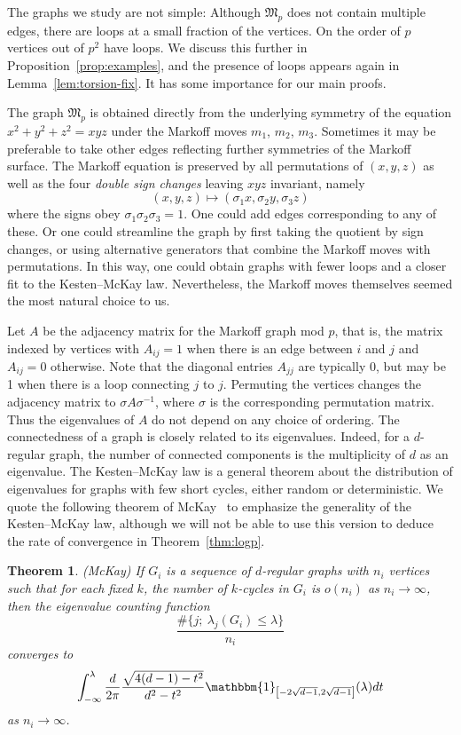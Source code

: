 \documentclass[10pt]{amsart}
\newtheorem{theo}{Theorem}[section]
\theoremstyle{definition}\newtheorem{defi}[theo]{Definition}\newtheorem{rema}[theo]{Remark}\newtheorem{exam}[theo]{Example}\newtheorem{exem}[theo]{Example}\newtheorem{nota}[theo]{Notation}
\begin{document}
The graphs we study are not simple: Although $\mathfrak{M}_p$ does not contain multiple edges, there are loops at a small fraction of the vertices. On the order of $p$ vertices out of $p^2$ have loops. We discuss this further in Proposition~\ref{prop:examples}, and the presence of loops appears again in Lemma~\ref{lem:torsion-fix}. It has some importance for our main proofs.

The graph $\mathfrak{M}_p$ is obtained directly from the underlying symmetry of the equation $x^2+y^2 +z^2 =xyz$ under the Markoff moves $m_1$, $m_2$, $m_3$. Sometimes it may be preferable to take other edges reflecting further symmetries of the Markoff surface. The Markoff equation is preserved by all permutations of $(x,y,z)$ as well as the four \emph{double sign changes} leaving $xyz$ invariant, namely
\begin{equation}\label{eqn:signs}
(x,y,z) \mapsto (\sigma_1 x, \sigma_2 y, \sigma_3 z)
\end{equation}
where the signs obey $\sigma_1 \sigma_2 \sigma_3 = 1$. One could add edges corresponding to any of these. Or one could streamline the graph by first taking the quotient by sign changes, or using alternative generators that combine the Markoff moves with permutations. In this way, one could obtain graphs with fewer loops and a closer fit to the Kesten--McKay law. Nevertheless, the Markoff moves themselves seemed the most natural choice to us.

Let $A$ be the adjacency matrix for the Markoff graph mod $p$, that is, the matrix indexed by vertices with $A_{ij} = 1$ when there is an edge between $i$ and $j$ and $A_{ij}=0$ otherwise. Note that the diagonal entries $A_{jj}$ are typically 0, but may be 1 when there is a loop connecting $j$ to $j$. Permuting the vertices changes the adjacency matrix to $\sigma A\sigma^{-1}$, where $\sigma$ is the corresponding permutation matrix. Thus the eigenvalues of $A$ do not depend on any choice of ordering. The connectedness of a graph is closely related to its eigenvalues. Indeed, for a $d$-regular graph, the number of connected components is the multiplicity of $d$ as an eigenvalue. The Kesten--McKay law is a general theorem about the distribution of eigenvalues for graphs with few short cycles, either random or deterministic. We quote the following theorem of McKay~\cite[Theorem~1.1]{M} to emphasize the generality of the Kesten--McKay law, although we will not be able to use this version to deduce the rate of convergence in Theorem~\ref{thm:logp}.

\begin{theo}(McKay)
If $G_i$ is a sequence of $d$-regular graphs with $n_i$ vertices such that for each fixed $k$, the number of $k$-cycles in $G_i$ is $o(n_i)$ as $n_i \rightarrow \infty$, then the eigenvalue counting function
\[
\frac{ \# \{ j ; \ \lambda_j(G_i) \leq \lambda \}}{n_i}
\]
converges to
\begin{equation*}\label{thm:mckay}
\int_{-\infty}^{\lambda} \frac{d}{2\pi} \frac{ \sqrt{4(d-1) - t^2} }{d^2 - t^2} \mathbbm{1}_{\left[-2\sqrt{d-1},2\sqrt{d-1}\right]}(\lambda) dt
\end{equation*}
as $n_i \rightarrow \infty$.
\end{theo}
\end{document}
